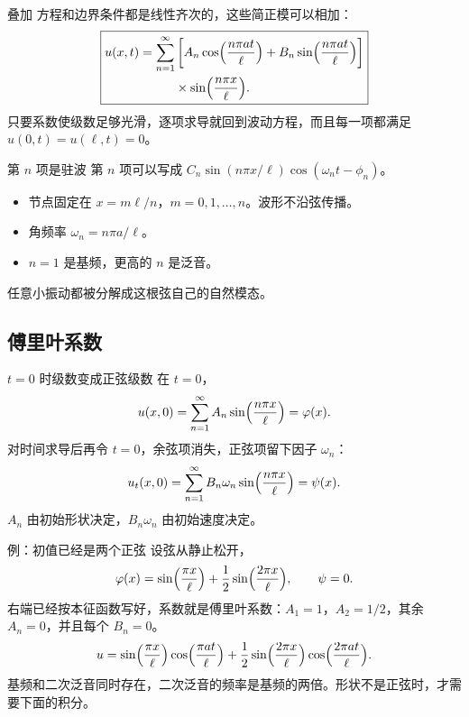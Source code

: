 \documentclass[fontset=windows, chinese, 10pt, xcolor=dvipsnames]{beamer}
\begin{document}
\begin{frame}{叠加}
  方程和边界条件都是线性齐次的，这些简正模可以相加：
  \begin{equation*}
    \boxed{
    \begin{aligned}
    u(x,t)=\sum_{n=1}^{\infty}
    &\left[A_n\cos\Bigl(\frac{n\pi a t}{\ell}\Bigr)
      +B_n\sin\Bigl(\frac{n\pi a t}{\ell}\Bigr)\right]\\
    &\times\sin\Bigl(\frac{n\pi x}{\ell}\Bigr).
    \end{aligned}}
  \end{equation*}
  只要系数使级数足够光滑，逐项求导就回到波动方程，而且每一项都满足 $u(0,t)=u(\ell,t)=0$。
\end{frame}

\begin{frame}{第 $n$ 项是驻波}
  第 $n$ 项可以写成 $C_n\sin(n\pi x/\ell)\cos(\omega_n t-\phi_n)$。
  \begin{itemize}
    \item 节点固定在 $x=m\ell/n$，$m=0,1,\ldots,n$。波形不沿弦传播。
    \item 角频率 $\omega_n=n\pi a/\ell$。
    \item $n=1$ 是基频，更高的 $n$ 是泛音。
  \end{itemize}
  任意小振动都被分解成这根弦自己的自然模态。
\end{frame}

\subsection{傅里叶系数}

\begin{frame}{$t=0$ 时级数变成正弦级数}
  在 $t=0$，
  \begin{equation*}
    u(x,0)=\sum_{n=1}^{\infty} A_n\sin\Bigl(\frac{n\pi x}{\ell}\Bigr)=\varphi(x).
  \end{equation*}
  对时间求导后再令 $t=0$，余弦项消失，正弦项留下因子 $\omega_n$：
  \begin{equation*}
    u_t(x,0)
    =\sum_{n=1}^{\infty} B_n\omega_n\sin\Bigl(\frac{n\pi x}{\ell}\Bigr)
    =\psi(x).
  \end{equation*}
  $A_n$ 由初始形状决定，$B_n\omega_n$ 由初始速度决定。
\end{frame}

\begin{frame}{例：初值已经是两个正弦}
  设弦从静止松开，
  \begin{equation*}
    \varphi(x)=\sin\Bigl(\frac{\pi x}{\ell}\Bigr)
      +\frac12\sin\Bigl(\frac{2\pi x}{\ell}\Bigr),
    \qquad \psi=0.
  \end{equation*}
  右端已经按本征函数写好，系数就是傅里叶系数：$A_1=1$，$A_2=1/2$，其余 $A_n=0$，并且每个 $B_n=0$。
  \begin{equation*}
    u=\sin\Bigl(\frac{\pi x}{\ell}\Bigr)\cos\Bigl(\frac{\pi a t}{\ell}\Bigr)
     +\frac12\sin\Bigl(\frac{2\pi x}{\ell}\Bigr)
      \cos\Bigl(\frac{2\pi a t}{\ell}\Bigr).
  \end{equation*}
  基频和二次泛音同时存在，二次泛音的频率是基频的两倍。形状不是正弦时，才需要下面的积分。
\end{frame}
\end{document}
